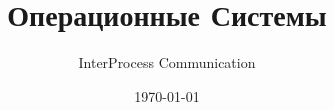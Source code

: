 \documentclass[handout,12pt]{beamer}
\title{Операционные Системы}
\subtitle{InterProcess Communication}
\date{\today}
\begin{document}
  \begin{frame}
    \titlepage
  \end{frame}
  
  
  
\end{document}
